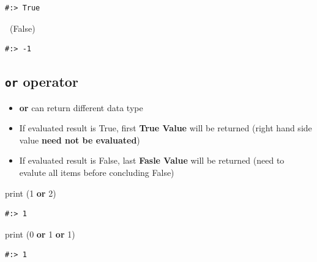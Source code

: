 \documentclass[
]{book}
\newenvironment{Shaded}{\begin{snugshade}}{\end{snugshade}}
\newcommand{\BuiltInTok}[1]{#1}
\newcommand{\DecValTok}[1]{\textcolor[rgb]{0.06,0.06,0.06}{#1}}
\newcommand{\KeywordTok}[1]{\textcolor[rgb]{0.27,0.27,0.27}{\textbf{#1}}}
\newcommand{\NormalTok}[1]{#1}
\newcommand{\OperatorTok}[1]{\textcolor[rgb]{0.43,0.43,0.43}{\textbf{#1}}}
\newcommand{\VariableTok}[1]{\textcolor[rgb]{0,0,0}{#1}}
\providecommand{\tightlist}{%
  \setlength{\itemsep}{0pt}\setlength{\parskip}{0pt}}
\begin{document}
\begin{verbatim}
#:> True
\end{verbatim}

\begin{Shaded}
\begin{Highlighting}[]
\OperatorTok{~}\NormalTok{(}\VariableTok{False}\NormalTok{)}
\end{Highlighting}
\end{Shaded}

\begin{verbatim}
#:> -1
\end{verbatim}

\hypertarget{or-operator}{%
\subsection{\texorpdfstring{\texttt{or} operator}{or operator}}\label{or-operator}}

\begin{itemize}
\tightlist
\item
  \textbf{or} can return different data type\\
\item
  If evaluated result is True, first \textbf{True Value} will be returned (right hand side value \textbf{need not be evaluated})\\
\item
  If evaluated result is False, last \textbf{Fasle Value} will be returned (need to evalute all items before concluding False)
\end{itemize}

\begin{Shaded}
\begin{Highlighting}[]
\BuiltInTok{print}\NormalTok{ (}\DecValTok{1} \KeywordTok{or} \DecValTok{2}\NormalTok{)}
\end{Highlighting}
\end{Shaded}

\begin{verbatim}
#:> 1
\end{verbatim}

\begin{Shaded}
\begin{Highlighting}[]
\BuiltInTok{print}\NormalTok{ (}\DecValTok{0} \KeywordTok{or} \DecValTok{1} \KeywordTok{or} \DecValTok{1}\NormalTok{)}
\end{Highlighting}
\end{Shaded}

\begin{verbatim}
#:> 1
\end{verbatim}
\end{document}
